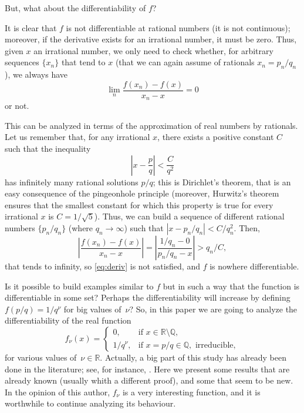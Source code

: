 \documentclass[11pt,a4paper,reqno]{amsart}
\def\R{\mathbb{R}}
\def\Q{\mathbb{Q}}
\theoremstyle{plain}
\theoremstyle{definition}
\begin{document}
But, what about the differentiability of $f$?

It is clear that $f$ is not differentiable at rational numbers (it is not continuous); 
moreover, if the derivative exists for an irrational number, it must be zero. Thus, given $x$ an irrational number, we only need to check whether, for arbitrary sequences $\{x_n\}$ that tend to $x$ 
(that we can again assume of rationals $x_n = p_n/q_n$), 
we always have
\begin{equation}
\label{eq:deriv}
  \lim_n \frac{f(x_n) - f(x)}{x_n - x} = 0
\end{equation}
or not.

This can be analyzed in terms of the approximation of real numbers by rationals. Let us remember that, for any irrational $x$, there exists a positive constant $C$ such that the inequality 
\begin{equation}
\label{eq:Cq2}
  \left| x - \frac{p}{q} \right| < \frac{C}{q^2}
\end{equation}
has infinitely many rational solutions $p/q$; 
this is Dirichlet's theorem, that is an easy consequence of the pingeonhole principle
(moreover, Hurwitz's theorem ensures that the smallest constant for which this property is true for every irrational $x$ is $C=1/\sqrt{5}$). Thus, we can build a sequence of different rational numbers $\{p_n/q_n\}$ (where $q_n\to\infty$) such that $| x - p_n/q_n| < {C}/{q_n^2}$. Then,
$$
  \left|\frac{f(x_n) - f(x)}{x_n - x} \right| 
  = \left|\frac{1/q_n - 0}{p_n/q_n - x} \right| > q_n/C,
$$
that tends to infinity, so \eqref{eq:deriv} is not satisfied, and $f$ is nowhere differentiable.

Is it possible to build examples similar to $f$ but in such a way that the function is differentiable in some set?
Perhaps the differentiability will increase by defining 
$f(p/q) = 1/q^{\nu}$ for big values of~$\nu$?
So, in this paper we are going to analyze the differentiability of the real function
$$
  f_\nu(x) =
\begin{cases}
  0, & \text{if } x \in \R \setminus \Q, \\
  1/q^\nu, & \text{if } x = p/q \in \Q, \text{ irreducible},
\end{cases}
$$
for various values of~$\nu \in \R$.
Actually, a big part of this study has already been done in the literature; see, for instance, \cite{DaTa, He, No, Ny}. Here we present some results that are already known (usually whith a different proof), and some that seem to be new. 
In the opinion of this author, 
$f_\nu$ is a very interesting function, and it is worthwhile to continue analyzing its behaviour.
\end{document}
